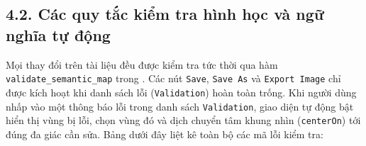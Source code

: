\subsection*{4.2. Các quy tắc kiểm tra hình học và ngữ nghĩa tự động}

Mọi thay đổi trên tài liệu đều được kiểm tra tức thời qua hàm \texttt{validate\_semantic\_map} trong . Các nút \texttt{Save}, \texttt{Save As} và \texttt{Export Image} chỉ được kích hoạt khi danh sách lỗi (\texttt{Validation}) hoàn toàn trống. Khi người dùng nhấp vào một thông báo lỗi trong danh sách \texttt{Validation}, giao diện tự động bật hiển thị vùng bị lỗi, chọn vùng đó và dịch chuyển tâm khung nhìn (\texttt{centerOn}) tới đúng đa giác cần sửa. Bảng dưới đây liệt kê toàn bộ các mã lỗi kiểm tra:

